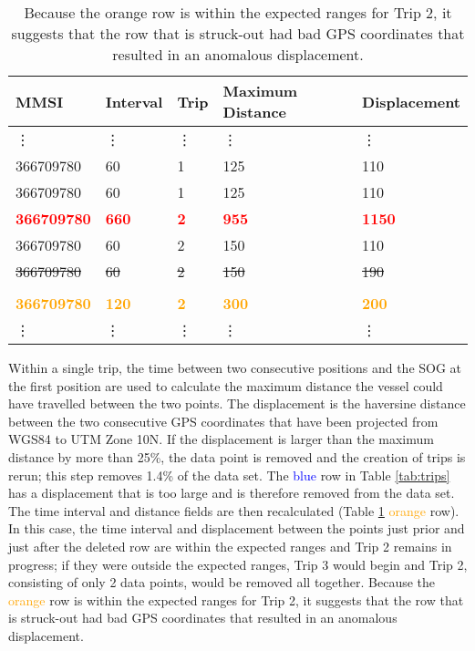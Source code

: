 \documentclass[twoside,symmetric,notoc]{tufte-book}
\begin{document}
\begin{table}
    \centering
    \begin{tabular}{l l l l l }
     MMSI       & Interval   & Trip  & Maximum Distance & Displacement  \\
     \hline
     \vdots     & \vdots & \vdots & \vdots & \vdots \\
     366709780	& 60    & 1 & 125 & 110 \\
     366709780	& 60    & 1 & 125 & 110 \\
     \textbf{\textcolor{red}{366709780}}	& \textbf{\textcolor{red}{660}}    & \textbf{\textcolor{red}{2}} & \textbf{\textcolor{red}{955}} & \textbf{\textcolor{red}{1150}} \\  
     366709780	& 60    & 2 & 150 & 110 \\ 
     \sout{366709780}	& \sout{60}    & \sout{2} & \sout{150} & \sout{190} \\  [-1.5ex]
     \hline \\[-1.5ex]
     \textbf{\textcolor{orange}{366709780}}	& \textbf{\textcolor{orange}{120}}    & \textbf{\textcolor{orange}{2}} & \textbf{\textcolor{orange}{300}} & \textbf{\textcolor{orange}{200}} \\
     \vdots     & \vdots & \vdots & \vdots & \vdots \\
     \hline
    \end{tabular}
    \caption{Because the orange row is within the expected ranges for Trip 2, it suggests that the row that is struck-out had bad GPS coordinates that resulted in an anomalous displacement.}
    \label{tab:trips2}
    \forcerectofloat
\end{table}
\par{
Within a single trip, the time between two consecutive positions and the SOG at the first position are used to calculate the maximum distance the vessel could have travelled between the two points. The displacement is the haversine distance between the two consecutive GPS coordinates that have been projected from WGS84 to UTM Zone 10N. If the displacement is larger than the maximum distance by more than 25\%, the data point is removed and the creation of trips is rerun; this step removes 1.4\% of the data set. The \textcolor{blue}{blue} row in Table \ref{tab:trips} has a displacement that is too large and is therefore removed from the data set. The time interval and distance fields are then recalculated (Table \ref{tab:trips2} \textcolor{orange}{orange} row). In this case, the time interval and displacement between the points just prior and just after the deleted row are within the expected ranges and Trip 2 remains in progress; if they were outside the expected ranges, Trip 3 would begin and Trip 2, consisting of only 2 data points, would be removed all together. Because the \textcolor{orange}{orange} row is within the expected ranges for Trip 2, it suggests that the row that is struck-out had bad GPS coordinates that resulted in an anomalous displacement.
}
\end{document}
